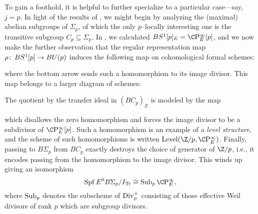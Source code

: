 \begin{example}
To gain a foothold, it is helpful to further specialize to a particular case---say, $j = p$.  In light of the results of , we might begin by analyzing the (maximal) abelian subgroups of $\Sigma_p$, of which the only $p$--locally interesting one is the transitive subgroup $C_p \subseteq \Sigma_p$.  In , we calculated $BS^1[p]_E = \CP^\infty_E[p]$, and we now make the further observation that the regular representation map $\rho\colon\thinspace BS^1[p] \to BU(p)$ induces the following map on cohomological formal schemes:
\begin{center}
\end{center}
where the bottom arrow sends such a homomorphism to its image divisor.  This map belongs to a larger diagram of schemes:
\begin{center}
\end{center}
The quotient by the transfer ideal in $(BC_p)_E$ is modeled by the map
\begin{center}
\end{center}
which disallows the zero homomorphism and forces the image divisor to be a subdivisor of $\CP^\infty_E[p]$.  Such a homomorphism is an example of a \textit{level structure}, and the scheme of such homomorphisms is written $\Level(\Z/p, \CP^\infty_E)$.  Finally, passing to $B\Sigma_p$ from $BC_p$ exactly destroys the choice of generator of $\Z/p$, i.e., it encodes passing from the homomorphism to the image divisor.  This winds up giving an isomorphism \[\Spf E^0 B\Sigma_p / I_{\Tr} \cong \Sub_p \CP^\infty_E,\] where $\operatorname{Sub}_p$ denotes the subscheme of $\operatorname{Div}_p^+$ consisting of those effective Weil divisors of rank $p$ which are subgroup divisors.
\end{example}

